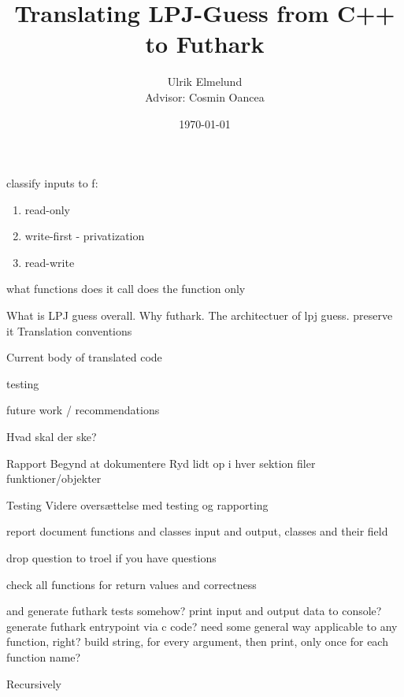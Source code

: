 
\author{Ulrik Elmelund\\ {\small{} Advisor: Cosmin Oancea}}
\date{\today}
\title{Translating LPJ-Guess from C++ to Futhark}








classify inputs to f:
\begin{enumerate}
  \item read-only
  \item write-first - privatization
  \item read-write
\end{enumerate}

what functions does it call
does the function only

What is LPJ guess overall.
Why futhark.
The architectuer of lpj guess.
  preserve it
Translation conventions

Current body of translated code

testing

future work / recommendations

Hvad skal der ske?

Rapport
  Begynd at dokumentere
  Ryd lidt op i hver sektion
  filer
  funktioner/objekter

Testing
Videre oversættelse med testing og rapporting


report
  document functions and classes
  input and output, classes and their field

drop question to troel if you have questions

check all functions for return values and correctness

and generate futhark tests somehow?
    print input and output data to console?
    generate futhark entrypoint via c code?
    need some general way applicable to any function, right?
    build string, for every argument, then print, only once for each function name?

Recursively

\printbibliography


